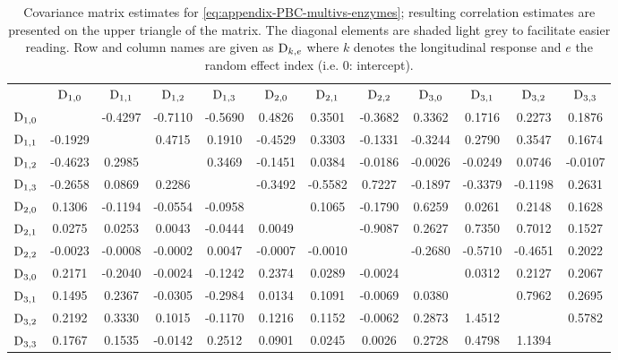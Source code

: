 \begin{table}[ht]
  \centering
  \setlength{\tabcolsep}{0.1pt} %
  \captionsetup{font=scriptsize}
  \begingroup\scriptsize
  \begin{tabular}{c:ccccccccccc}
  & $\mathrm{D}_{1,0}$ & $\mathrm{D}_{1,1}$ & $\mathrm{D}_{1,2}$ & $\mathrm{D}_{1,3}$ & $\mathrm{D}_{2,0}$ & $\mathrm{D}_{2,1}$ & $\mathrm{D}_{2,2}$ & $\mathrm{D}_{3,0}$ & $\mathrm{D}_{3,1}$ & $\mathrm{D}_{3,2}$ & $\mathrm{D}_{3,3}$ \\ 
  \hdashline
  $\mathrm{D}_{1,0}$ &  & -0.4297 & -0.7110 & -0.5690 &  0.4826 &  0.3501 & -0.3682 &  0.3362 &  0.1716 &  0.2273 &  0.1876 \\ 
  $\mathrm{D}_{1,1}$ & -0.1929 &  &  0.4715 &  0.1910 & -0.4529 &  0.3303 & -0.1331 & -0.3244 &  0.2790 &  0.3547 &  0.1674 \\ 
  $\mathrm{D}_{1,2}$ & -0.4623 &  0.2985 &  &  0.3469 & -0.1451 &  0.0384 & -0.0186 & -0.0026 & -0.0249 &  0.0746 & -0.0107 \\ 
  $\mathrm{D}_{1,3}$ & -0.2658 &  0.0869 &  0.2286 &  & -0.3492 & -0.5582 &  0.7227 & -0.1897 & -0.3379 & -0.1198 &  0.2631 \\ 
  $\mathrm{D}_{2,0}$ &  0.1306 & -0.1194 & -0.0554 & -0.0958 &  &  0.1065 & -0.1790 &  0.6259 &  0.0261 &  0.2148 &  0.1628 \\ 
  $\mathrm{D}_{2,1}$ &  0.0275 &  0.0253 &  0.0043 & -0.0444 &  0.0049 &  & -0.9087 &  0.2627 &  0.7350 &  0.7012 &  0.1527 \\ 
  $\mathrm{D}_{2,2}$ & -0.0023 & -0.0008 & -0.0002 &  0.0047 & -0.0007 & -0.0010 &  & -0.2680 & -0.5710 & -0.4651 &  0.2022 \\ 
  $\mathrm{D}_{3,0}$ &  0.2171 & -0.2040 & -0.0024 & -0.1242 &  0.2374 &  0.0289 & -0.0024 &  &  0.0312 &  0.2127 &  0.2067 \\ 
  $\mathrm{D}_{3,1}$ &  0.1495 &  0.2367 & -0.0305 & -0.2984 &  0.0134 &  0.1091 & -0.0069 &  0.0380 &  &  0.7962 &  0.2695 \\ 
  $\mathrm{D}_{3,2}$ &  0.2192 &  0.3330 &  0.1015 & -0.1170 &  0.1216 &  0.1152 & -0.0062 &  0.2873 &  1.4512 &  &  0.5782 \\ 
  $\mathrm{D}_{3,3}$ &  0.1767 &  0.1535 & -0.0142 &  0.2512 &  0.0901 &  0.0245 &  0.0026 &  0.2728 &  0.4798 &  1.1394 &  \\ 
  \hline
  \end{tabular}
  \endgroup
  \caption{Covariance matrix estimates for \eqref{eq:appendix-PBC-multivs-enzymes}; resulting correlation estimates are presented on the upper triangle of the matrix. The diagonal elements are shaded light grey to facilitate easier reading. Row and column names are given as $\mathrm{D}_{k, e}$ where $k$ denotes the longitudinal response and $e$ the random effect index (i.e. 0: intercept).}
  \label{tab:appendix-PBC-multivs-enzymes-cov}
\end{table}

